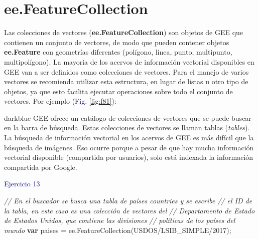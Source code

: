 \documentclass[
  12pt,
  letterpaper,
  twoside]{book}
\newenvironment{Shaded}{\begin{snugshade}}{\end{snugshade}}
\newcommand{\CommentTok}[1]{\textcolor[rgb]{0.24,0.58,0.00}{\textit{#1}}}
\newcommand{\ControlFlowTok}[1]{\textcolor[rgb]{0.00,0.00,0.00}{\textbf{#1}}}
\newcommand{\FunctionTok}[1]{\textcolor[rgb]{0.48,0.12,0.64}{#1}}
\newcommand{\KeywordTok}[1]{\textcolor[rgb]{0.48,0.12,0.64}{#1}}
\newcommand{\NormalTok}[1]{#1}
\newcommand{\OperatorTok}[1]{\textcolor[rgb]{0.00,0.00,0.00}{#1}}
\newcommand{\StringTok}[1]{\textcolor[rgb]{0.87,0.29,0.22}{#1}}
\newcommand\boldpurple[1]{\textcolor{darkpurple}{\textbf{#1}}}
\begin{document}
\newpage

\hypertarget{ee.featurecollection-1}{%
\chapter{ee.FeatureCollection}\label{ee.featurecollection-1}}

Las colecciones de vectores (\boldpurple{ee.FeatureCollection}) son objetos de GEE que contienen un conjunto de vectores, de modo que pueden contener objetos \boldpurple{ee.Feature} con geometrías diferentes (polígono, línea, punto, multipunto, multipolígono). La mayoría de los acervos de información vectorial disponibles en GEE van a ser definidos como colecciones de vectores. Para el manejo de varios vectores se recomienda utilizar esta estructura, en lugar de listas u otro tipo de objetos, ya que esto facilita ejecutar operaciones sobre todo el conjunto de vectores. Por ejemplo (\textcolor{darkblue}{Fig.} \ref{fig:f81}):

\begin{bluebox2}

\begin{awesomeblock}{5pt}{\faLightbulb}{darkblue}
GEE ofrece un catálogo de colecciones de vectores que se puede buscar en la barra de búsqueda. Estas colecciones de vectores se llaman tablas (\emph{tables}).
La búsqueda de información vectorial en los acervos de GEE es más difícil que la búsqueda de imágenes. Eso ocurre porque a pesar de que hay mucha información vectorial disponible (compartida por usuarios), solo está indexada la información compartida por Google.

\end{awesomeblock}

\end{bluebox2}

\textcolor{darkblue}{Ejercicio 13}

\begin{Shaded}
\begin{Highlighting}[]
\CommentTok{// En el buscador se busca una tabla de países \textquotesingle{}countries\textquotesingle{} y se escribe }
\CommentTok{// el ID de la tabla, en este caso es una colección de vectores del }
\CommentTok{// Departamento de Estado de Estados Unidos, que contiene las divisiones }
\CommentTok{// políticas de los países del mundo  }
\ControlFlowTok{var}\NormalTok{ paises }\OperatorTok{=} \KeywordTok{ee}\OperatorTok{.}\FunctionTok{FeatureCollection}\NormalTok{(}\StringTok{\textquotesingle{}USDOS/LSIB\_SIMPLE/2017\textquotesingle{}}\NormalTok{)}\OperatorTok{;}
\end{Highlighting}
\end{Shaded}
\end{document}
